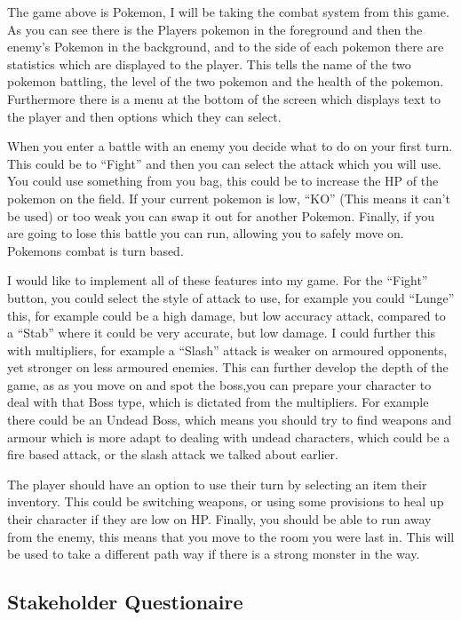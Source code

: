 \documentclass[14pt]{article}
\begin{document}
The game above is Pokemon, I will be taking the combat system from this game. As you can see there is the Players pokemon in the foreground and then the enemy’s Pokemon in the background, and to the side of each pokemon there are statistics which are displayed to the player. This tells the name of the two pokemon battling, the level of the two pokemon and the health of the pokemon. Furthermore there is a menu at the bottom of the screen which displays text to the player and then options which they can select. 

When you enter a battle with an enemy you decide what to do on your first turn. This could be to “Fight” and then you can select the attack which you will use. You could use something from you bag, this could be to increase the HP of the pokemon on the field. If your current pokemon is low, “KO” (This means it can’t be used) or too weak you can swap it out for another Pokemon. Finally, if you are going to lose this battle you can run, allowing you to safely move on. Pokemons combat is turn based.

I would like to implement all of these features into my game. For the “Fight” button, you could select the style of attack to use, for example you could “Lunge” this, for example could be a high damage, but low accuracy attack, compared to a “Stab” where it could be very accurate, but low damage. I could further this with multipliers, for example a “Slash” attack is weaker on armoured opponents, yet stronger on less armoured enemies. This can further develop the depth of the game, as as you move on and spot the boss,you can prepare your character to deal with that Boss type, which is dictated from the multipliers. For example there could be an Undead Boss, which means you should try to find weapons and armour which is more adapt to dealing with undead characters, which could be a fire based attack, or the slash attack we talked about earlier.

The player should have an option to use their turn by selecting an item their inventory. This could be switching weapons, or using some provisions to heal up their character if they are low on HP. Finally, you should be able to run away from the enemy, this means that you move to the room you were last in. This will be used to take a different path way if there is a strong monster in the way.
	
		\subsection{Stakeholder Questionaire}
\end{document}
